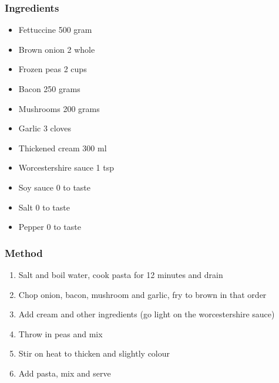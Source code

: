 \documentclass[]{article}
\begin{document}
\subsubsection*{\Large Ingredients}
\begin{multicols}{2}
\begin{itemize}
 \item Fettuccine \hfill 500 gram
 \item Brown onion \hfill 2 whole
 \item Frozen peas \hfill 2 cups
 \item Bacon \hfill 250 grams
 \item Mushrooms \hfill 200 grams
 \item Garlic \hfill 3 cloves
 \item Thickened cream \hfill 300 ml
 \item Worcestershire sauce \hfill 1 tsp
 \item Soy sauce \hfill 0 to taste
 \item Salt \hfill 0 to taste
 \item Pepper \hfill 0 to taste
\end{itemize}
\end{multicols}
\subsubsection*{\Large Method}
\begin{enumerate}[font=\huge\color{accent}]
	\item Salt and boil water, cook pasta for 12 minutes and drain
	\item Chop onion, bacon, mushroom and garlic, fry to brown in that order
	\item Add cream and other ingredients (go light on the worcestershire sauce)
	\item Throw in peas and mix
	\item Stir on heat to thicken and slightly colour
	\item Add pasta, mix and serve
\end{enumerate}
\newpage
{}\label{rec:Fettuccine Alfredo}
\end{document}
